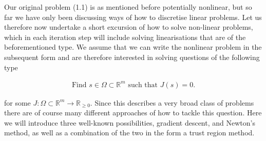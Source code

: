 \documentclass[../draft_1.tex]{subfiles}
\begin{document}
Our original problem (1.1) is as mentioned before potentially nonlinear, but so far we have only been discussing ways of how to discretise linear problems. Let us therefore now undertake a short excursion of how to solve non-linear problems, which in each iteration step will include solving linearisations that are of the beforementioned type. We assume that we can write the nonlinear problem in the subsequent form and are therefore interested in solving questions of the following type 

\begin{ceqn}
	\begin{align}
	\text{Find } s \in \Omega \subset \mathbb{R}^m \text{ such that } J(s) = 0. 
	\end{align}
\end{ceqn}
for some $J: \Omega \subset \mathbb{R}^m \rightarrow \mathbb{R}_{\geq 0}$. Since this describes a very broad class of problems there are of course many different approaches of how to tackle this question. Here we will introduce three well-known possibilities, gradient descent, and Newton's method, as well as a combination of the two in the form a trust region method. 
\end{document}
